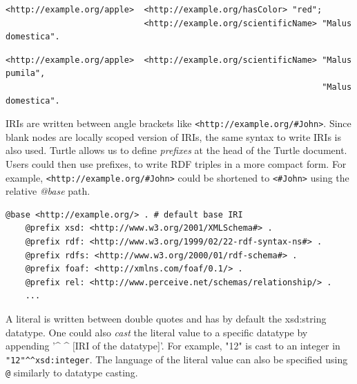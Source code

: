 \begin{lstlisting}[label={lst:same_subject}, 
    caption={Usage of ';' where triples share the same subject.}]
<http://example.org/apple>  <http://example.org/hasColor> "red";
                            <http://example.org/scientificName> "Malus domestica".
\end{lstlisting}

\begin{lstlisting}[label={lst:different_object}, 
    caption={Usage of ',' where triples differs only in the objects.}]
<http://example.org/apple>  <http://example.org/scientificName> "Malus pumila", 
                                                                "Malus domestica".
\end{lstlisting}


IRIs are written between angle brackets like \lstinline{<http://example.org/#John>}.
Since blank nodes are locally scoped version of IRIs, the same syntax to write IRIs is also used.
Turtle allows us to define \textit{prefixes} at the head of the Turtle document.
Users could then use prefixes, to write RDF triples in a more compact form. For example,
\lstinline{<http://example.org/#John>} could be shortened to
\lstinline{<#John>} using the relative \textit{@base} path.

\begin{lstlisting}[caption={Prefixes in TURTLE syntax.}, float]
    @base <http://example.org/> . # default base IRI
    @prefix xsd: <http://www.w3.org/2001/XMLSchema#> .
    @prefix rdf: <http://www.w3.org/1999/02/22-rdf-syntax-ns#> .
    @prefix rdfs: <http://www.w3.org/2000/01/rdf-schema#> .
    @prefix foaf: <http://xmlns.com/foaf/0.1/> .
    @prefix rel: <http://www.perceive.net/schemas/relationship/> . 
    ... 
\end{lstlisting}

A literal is written between double quotes and has by
default the xsd:string datatype. 
One could also \textit{cast} the literal value to a specific datatype 
by appending '\textasciicircum{} \textasciicircum{} $[$IRI of the datatype$]$'. For example, 
"12" is cast to an integer in \lstinline{"12"^^xsd:integer}.
The language of the literal value 
can also be specified using \lstinline{@} similarly to datatype casting. 

